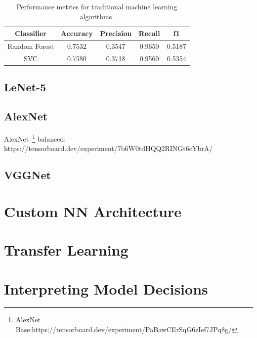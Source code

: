 \begin{table}[H]
    \centering
    \begin{tabular}{||c c c c c||} 
    \hline
    Classifier & Accuracy & Precision & Recall & f1\\ [0.5ex] 
    \hline\hline
    Random Forest & 0.7532 & 0.3547 & 0.9650 & 0.5187\\ 
    \hline
    SVC & 0.7580 & 0.3718 & 0.9560 & 0.5354\\
    \hline
    \end{tabular}
    \caption{Performance metrics for traditional machine learning algorithms.}
    \label{table:mlmetrics}
\end{table}

\subsection{LeNet-5}
\subsection{AlexNet}
AlexNet~\footnote{AlexNet Base:https://tensorboard.dev/experiment/PaBawCErSqG6zIef7JPq8g/}
balanced: https://tensorboard.dev/experiment/7b6W0tdHQQ2RINGt6cYbrA/

\subsection{VGGNet}


\section{Custom NN Architecture}

\section{Transfer Learning}

\section{Interpreting Model Decisions}


